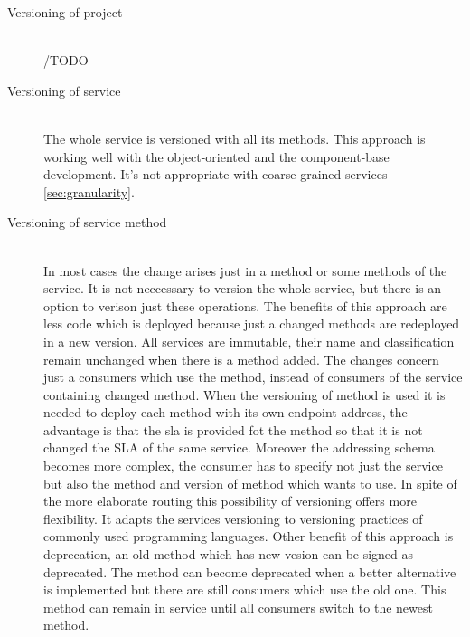 \begin{description}
  \item[Versioning of project] \hfil\\
  /TODO 
  \item[Versioning of service] \hfill\\
  The whole service is versioned with all its methods. This approach is working well with the object-oriented and the component-base development. It's not appropriate with coarse-grained services \ref{sec:granularity}.%
  \item[Versioning of service method]  \hfill\\
  In most cases the change arises just in a method or some methods of the service. It is not neccessary to version the whole service, but there is an option to verison just these operations.
  The benefits of this approach are less code which is deployed because just a changed methods are redeployed in a new version. All services are immutable, their name and classification remain unchanged when there is a method added. The changes concern just a consumers which use the method, instead of consumers of the service containing changed method. 
  When the versioning of method is used it is needed to deploy each method with its own endpoint address, the advantage is that the \gls{sla} is provided fot the method so that it is not changed the SLA of the same service.
  Moreover the addressing schema becomes more complex, the consumer has to specify not just the service but also the method and version of method which wants to use.
In spite of the more elaborate routing this possibility of versioning offers more flexibility. It adapts the services versioning to versioning practices of commonly used programming languages. 
Other benefit of this approach is deprecation, an old method which has new vesion can be signed as deprecated. The method can become deprecated when a better alternative is implemented but there are still consumers which use the old one. This method can remain in service until all consumers switch to the newest method.
\end{description}


